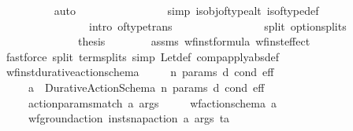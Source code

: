 \begin{isabellebody}
\ \ \ \ \ \ \ \ \isamarkupfalse%
\ {\isacharparenleft}{\kern0pt}auto\isanewline
\ \ \ \ \ \ \ \ \ \ \ \ \ \ \ \ simp{\isacharcolon}{\kern0pt}\ is{\isacharunderscore}{\kern0pt}obj{\isacharunderscore}{\kern0pt}of{\isacharunderscore}{\kern0pt}type{\isacharunderscore}{\kern0pt}alt\ is{\isacharunderscore}{\kern0pt}of{\isacharunderscore}{\kern0pt}type{\isacharunderscore}{\kern0pt}def\isanewline
\ \ \ \ \ \ \ \ \ \ \ \ \ \ \ \ intro{\isacharcolon}{\kern0pt}\ of{\isacharunderscore}{\kern0pt}type{\isacharunderscore}{\kern0pt}trans\isanewline
\ \ \ \ \ \ \ \ \ \ \ \ \ \ \ \ split{\isacharcolon}{\kern0pt}\ option{\isachardot}{\kern0pt}splits{\isacharparenright}{\kern0pt}\isanewline
\ \ \ \ \ \ \ \ \isamarkupfalse%
\isanewline
\ \ \ \ \ \ \isamarkupfalse%
\isanewline
\ \ \ \ \isamarkupfalse%
\ \isamarkupfalse%
\ {\isacharquery}{\kern0pt}thesis\isanewline
\ \ \ \ \ \ \isamarkupfalse%
\ assms\ wf{\isacharunderscore}{\kern0pt}inst{\isacharunderscore}{\kern0pt}formula\ wf{\isacharunderscore}{\kern0pt}inst{\isacharunderscore}{\kern0pt}effect\isanewline
\ \ \ \ \ \ \isamarkupfalse%
\ {\isacharparenleft}{\kern0pt}fastforce\ split{\isacharcolon}{\kern0pt}\ term{\isachardot}{\kern0pt}splits\ simp{\isacharcolon}{\kern0pt}\ Let{\isacharunderscore}{\kern0pt}def\ comp{\isacharunderscore}{\kern0pt}apply{\isacharbrackleft}{\kern0pt}abs{\isacharunderscore}{\kern0pt}def{\isacharbrackright}{\kern0pt}{\isacharparenright}{\kern0pt}\isanewline
\ \ \isamarkupfalse%
%
\endisatagproof
{\isafoldproof}%
%
\isadelimproof
\isanewline
%
\endisadelimproof
\isanewline
\ \ \isamarkupfalse%
\ wf{\isacharunderscore}{\kern0pt}inst{\isacharunderscore}{\kern0pt}durative{\isacharunderscore}{\kern0pt}action{\isacharunderscore}{\kern0pt}schema{\isacharcolon}{\kern0pt}\isanewline
\ \ \ \ \ n\ params\ d\ cond\ eff\isanewline
\ \ \ \ \ {\isachardoublequoteopen}a\ {\isasymequiv}\ Durative{\isacharunderscore}{\kern0pt}Action{\isacharunderscore}{\kern0pt}Schema\ n\ params\ d\ cond\ eff{\isachardoublequoteclose}\ \ \isanewline
\ \ \ \ \ {\isachardoublequoteopen}action{\isacharunderscore}{\kern0pt}params{\isacharunderscore}{\kern0pt}match\ a\ args{\isachardoublequoteclose}\isanewline
\ \ \ \ \ {\isachardoublequoteopen}wf{\isacharunderscore}{\kern0pt}action{\isacharunderscore}{\kern0pt}schema\ a{\isachardoublequoteclose}\isanewline
\ \ \ \ \ {\isachardoublequoteopen}wf{\isacharunderscore}{\kern0pt}ground{\isacharunderscore}{\kern0pt}action\ {\isacharparenleft}{\kern0pt}inst{\isacharunderscore}{\kern0pt}snap{\isacharunderscore}{\kern0pt}action\ a\ args\ ta{\isacharparenright}{\kern0pt}{\isachardoublequoteclose}\isanewline

\end{isabellebody}
